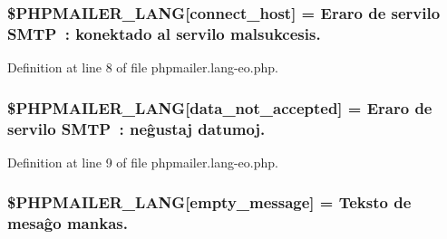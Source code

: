 \subsubsection[{\texorpdfstring{\$\+P\+H\+P\+M\+A\+I\+L\+E\+R\+\_\+\+L\+A\+NG}{$PHPMAILER_LANG}}]{\setlength{\rightskip}{0pt plus 5cm}\$P\+H\+P\+M\+A\+I\+L\+E\+R\+\_\+\+L\+A\+NG\mbox{[}\textquotesingle{}connect\+\_\+host\textquotesingle{}\mbox{]} = \textquotesingle{}Eraro de servilo S\+M\+T\+P \+: konektado al servilo malsukcesis.\textquotesingle{}}\hypertarget{phpmailer_8lang-eo_8php_a2ee0cc637a06b96e45600db31c6799ee}{}\label{phpmailer_8lang-eo_8php_a2ee0cc637a06b96e45600db31c6799ee}


Definition at line 8 of file phpmailer.\+lang-\/eo.\+php.

\subsubsection[{\texorpdfstring{\$\+P\+H\+P\+M\+A\+I\+L\+E\+R\+\_\+\+L\+A\+NG}{$PHPMAILER_LANG}}]{\setlength{\rightskip}{0pt plus 5cm}\$P\+H\+P\+M\+A\+I\+L\+E\+R\+\_\+\+L\+A\+NG\mbox{[}\textquotesingle{}data\+\_\+not\+\_\+accepted\textquotesingle{}\mbox{]} = \textquotesingle{}Eraro de servilo S\+M\+T\+P \+: neĝustaj datumoj.\textquotesingle{}}\hypertarget{phpmailer_8lang-eo_8php_a814c6b191205d2361b3233e9c9d6fda5}{}\label{phpmailer_8lang-eo_8php_a814c6b191205d2361b3233e9c9d6fda5}


Definition at line 9 of file phpmailer.\+lang-\/eo.\+php.

\subsubsection[{\texorpdfstring{\$\+P\+H\+P\+M\+A\+I\+L\+E\+R\+\_\+\+L\+A\+NG}{$PHPMAILER_LANG}}]{\setlength{\rightskip}{0pt plus 5cm}\$P\+H\+P\+M\+A\+I\+L\+E\+R\+\_\+\+L\+A\+NG\mbox{[}\textquotesingle{}empty\+\_\+message\textquotesingle{}\mbox{]} = \textquotesingle{}Teksto de mesaĝo mankas.\textquotesingle{}}\hypertarget{phpmailer_8lang-eo_8php_a33772099f637c9d6c2cd7425e0e37fed}{}\label{phpmailer_8lang-eo_8php_a33772099f637c9d6c2cd7425e0e37fed}


